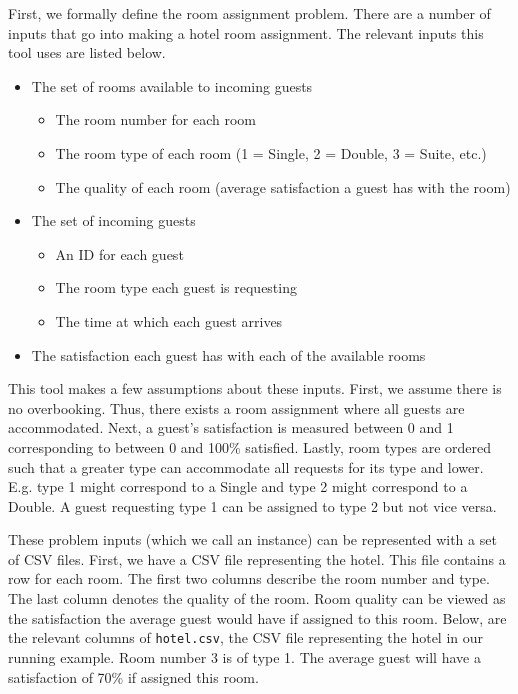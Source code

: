 \documentclass[11 pt]{article}
\begin{document}
\par First, we formally define the room assignment problem. There are a number of inputs that go into making a hotel room assignment. The relevant inputs this tool uses are listed below.
\begin{itemize}
    \item The set of rooms available to incoming guests
    \begin{itemize}
        \item The room number for each room
        \item The room type of each room (1 = Single, 2 = Double, 3 = Suite, etc.)
        \item The quality of each room (average satisfaction a guest has with the room)
    \end{itemize}
    \item The set of incoming guests
    \begin{itemize}
        \item An ID for each guest
        \item The room type each guest is requesting
        \item The time at which each guest arrives 
    \end{itemize}
    \item The satisfaction each guest has with each of the available rooms
\end{itemize}
\par This tool makes a few assumptions about these inputs. First, we assume there is no overbooking. Thus, there exists a room assignment where all guests are accommodated. Next, a guest's satisfaction is measured between 0 and 1 corresponding to between 0 and 100\% satisfied. Lastly, room types are ordered such that a greater type can accommodate all requests for its type and lower. E.g. type 1 might correspond to a Single and type 2 might correspond to a Double. A guest requesting type 1 can be assigned to type 2 but not vice versa.
\par These problem inputs (which we call an instance) can be represented with a set of CSV files. First, we have a CSV file representing the hotel. This file contains a row for each room. The first two columns describe the room number and type. The last column denotes the quality of the room. Room quality can be viewed as the satisfaction the average guest would have if assigned to this room. Below, are the relevant columns of \texttt{hotel.csv}, the CSV file representing the hotel in our running example. Room number 3 is of type 1. The average guest will have a satisfaction of 70\% if assigned this room.
\end{document}
